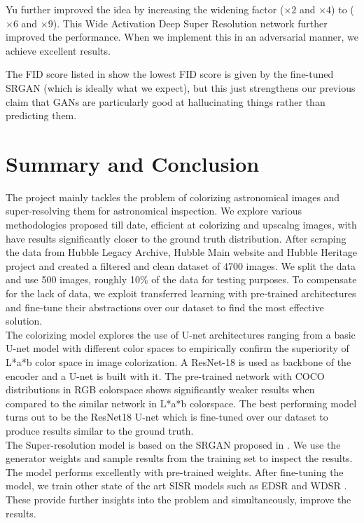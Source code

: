\documentclass[10pt,twocolumn,letterpaper]{article}
\begin{document}
\hspace*{0.167 in}Yu \etal\cite{yu2018wide} further improved the idea by increasing the widening factor ($\times 2$ and $\times 4$) to ($\times 6$ and $\times 9$). This Wide Activation Deep Super Resolution network further improved the performance. When we implement this in an adversarial manner, we achieve excellent results. 
    
The FID score listed in  show the lowest FID score is given by the fine-tuned SRGAN (which is ideally what we expect), but this just strengthens our previous claim that GANs are particularly good at hallucinating things rather than predicting them. 
\section{Summary and Conclusion}
    The project mainly tackles the problem of colorizing astronomical images and super-resolving them for astronomical inspection. We explore various methodologies proposed till date, efficient at colorizing and upscalng images, with have results significantly closer to the ground truth distribution. After scraping the data from Hubble Legacy Archive, Hubble Main website and Hubble Heritage project and created a filtered and clean dataset of 4700 images. We split the data and use 500 images, roughly 10\% of the data for testing purposes. To compensate for the lack of data, we exploit transferred learning with pre-trained architectures and fine-tune their abstractions over our dataset to find the most effective solution.\\
    \hspace*{0.167 in}The colorizing model explores the use of U-net architectures ranging from a basic U-net model with different color spaces to empirically confirm the superiority of L*a*b color space in image colorization. A ResNet-18  is used as backbone of the encoder and a U-net is built with it. The pre-trained network with COCO distributions in RGB colorspace shows significantly weaker results when compared to the similar network in L*a*b colorspace. The best performing model turns out to be the ResNet18 U-net which is fine-tuned over our dataset to produce results similar to the ground truth.\\
    \hspace*{0.167 in}The Super-resolution model is based on the SRGAN proposed in \cite{ledig2017photorealistic}. We use the generator weights and sample results from the training set to inspect the results. The model performs excellently with pre-trained weights. After fine-tuning the model, we train other state of the art SISR models such as EDSR \cite{lim2017enhanced} and WDSR \cite{yu2018wide}. These provide further insights into the problem and simultaneously, improve the results.\\
\end{document}
